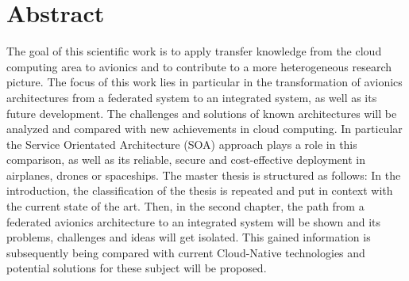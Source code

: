 \documentclass[titlepage]{report}
\begin{document}
\chapter*{Abstract}
The goal of this scientific work is to apply transfer knowledge from the cloud computing area to avionics and to
contribute to a more heterogeneous research picture. The focus of this work lies in particular in the transformation
of avionics architectures from a federated system to an integrated system, as well as its future development.
The challenges and solutions of known architectures will be analyzed and compared with new
achievements in cloud computing. In particular
the Service Orientated Architecture (SOA) approach plays a role in this comparison, as well as its
reliable, secure and cost-effective deployment in airplanes, drones or spaceships.
The master thesis is structured as follows: In the introduction, the classification of the thesis is repeated
and put in context with the current state of the art. Then, in the second chapter, the path from a federated
avionics architecture to an integrated system will be shown and its problems, challenges
and ideas will get isolated. This gained information is subsequently being compared with current Cloud-Native technologies
and potential solutions for these subject will be proposed.

\tableofcontents
\end{document}

